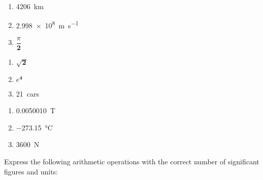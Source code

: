 \documentclass[12pt]{../ossphysics}
\begin{document}
\begin{questions}
  \vspace{.15in}
  \begin{minipage}{.32\textwidth}
    \begin{enumerate}[
        itemsep=20pt,
        label={(\alph*) \underline{\hspace{.6in}}},
        leftmargin=70pt]
    \item\SI{4206}{\kilo\metre}
    \item\SI{2.998e8}{\metre\per\second}
    \item$\dfrac\pi{\mathbf 2}$
    \end{enumerate}
  \end{minipage}
  \begin{minipage}{.32\textwidth}
    \begin{enumerate}[itemsep=20pt,label={(\alph*) \underline{\hspace{.6in}}},
        leftmargin=70pt,start=5]
    \item$\sqrt{\mathbf 2}$
    \item$e^{\mathbf 4}$
    \item\SI{21}{cars}
    \end{enumerate}
  \end{minipage}
  \begin{minipage}{.32\textwidth}
    \begin{enumerate}[itemsep=20pt,label={(\alph*) \underline{\hspace{.6in}}},
        leftmargin=70pt,start=9]
    \item\SI{.0050010}\tesla
    \item\SI{-273.15}\celsius
    \item\SI{3600}\newton
    \end{enumerate}
  \end{minipage}
  \vspace{.15in}

  \question Express the following arithmetic operations with the correct number
  of significant figures and units:
  

\end{questions}
\end{document}
